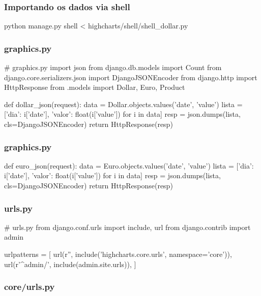 \documentclass[aspectratio=169]{beamer}
\begin{document}
{\begin{frame}[fragile]\frametitle{Importando os dados via shell}

\begin{bashcode}
python manage.py shell < highcharts/shell/shell_dollar.py
\end{bashcode}

\end{frame}

\begin{frame}[fragile]\frametitle{graphics.py}

\begin{pythoncode}
# graphics.py
import json
from django.db.models import Count
from django.core.serializers.json import DjangoJSONEncoder
from django.http import HttpResponse
from .models import Dollar, Euro, Product


def dollar_json(request):
    data = Dollar.objects.values('date', 'value')
    lista = [{'dia': i['date'], 
              'valor': float(i['value'])} for i in data]
    resp = json.dumps(lista, cls=DjangoJSONEncoder)
    return HttpResponse(resp)
\end{pythoncode}

\end{frame}

\begin{frame}[fragile]\frametitle{graphics.py}

\begin{pythoncode}
def euro_json(request):
    data = Euro.objects.values('date', 'value')
    lista = [{'dia': i['date'], 
              'valor': float(i['value'])} for i in data]
    resp = json.dumps(lista, cls=DjangoJSONEncoder)
    return HttpResponse(resp)
\end{pythoncode}

\end{frame}

\begin{frame}[fragile]\frametitle{urls.py}

\begin{pythoncode}
# urls.py
from django.conf.urls import include, url
from django.contrib import admin

urlpatterns = [
    url(r'', include('highcharts.core.urls', namespace='core')),
    url(r'^admin/', include(admin.site.urls)),
]
\end{pythoncode}

\end{frame}

\begin{frame}[fragile]\frametitle{core/urls.py}


\end{frame}}
\end{document}
